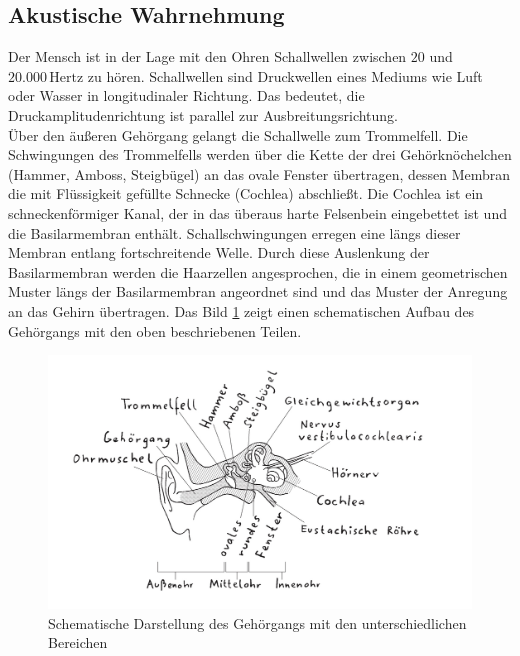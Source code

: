\subsection{Akustische Wahrnehmung}
Der Mensch ist in der Lage mit den Ohren Schallwellen zwischen $ 20 $ und $ 20.000\,\mathrm{Hertz} $ zu hören. Schallwellen sind Druckwellen eines Mediums wie Luft oder Wasser in longitudinaler Richtung. Das bedeutet, die Druckamplitudenrichtung ist parallel zur Ausbreitungsrichtung. \cite[Vgl. Seite 217]{Schonhammer.2013} \\
\glqq Über den äußeren Gehörgang gelangt die Schallwelle zum Trommelfell. Die Schwingungen des Trommelfells werden über die Kette der drei Gehörknöchelchen (Hammer, Amboss, Steigbügel) an das ovale Fenster übertragen, dessen Membran die mit Flüssigkeit gefüllte Schnecke (Cochlea) abschließt. Die Cochlea ist ein schneckenförmiger Kanal, der in das überaus harte Felsenbein eingebettet ist und die Basilarmembran enthält. Schallschwingungen erregen eine längs dieser Membran entlang fortschreitende Welle. Durch diese Auslenkung der Basilarmembran werden die Haarzellen angesprochen, die in einem geometrischen Muster längs der Basilarmembran angeordnet sind und das Muster der Anregung an das Gehirn übertragen. \grqq{} \cite[Seite 71f.]{Bernstein.2019}
Das Bild \ref{fig:Ohr} zeigt einen schematischen Aufbau des Gehörgangs mit den oben beschriebenen Teilen.
\begin{figure}[hbt]
	\centering
	\includegraphics[width=0.7\linewidth]{images/Ohr}
	\caption[Schematische Darstellung des Gehörgangs mit den unterschiedlichen Bereichen]{Schematische Darstellung des Gehörgangs mit den unterschiedlichen Bereichen \cite[Seite 219]{Schonhammer.2013}}
	\label{fig:Ohr}
\end{figure}
